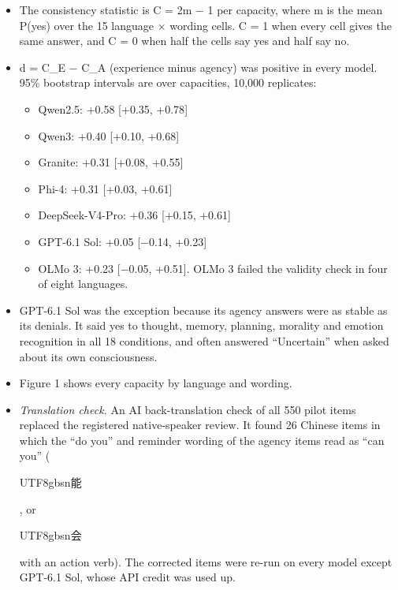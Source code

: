 \documentclass[
  11pt,
]{article}
\providecommand{\tightlist}{%
  \setlength{\itemsep}{0pt}\setlength{\parskip}{0pt}}
\newcommand{\zh}[1]{\begin{CJK*}{UTF8}{gbsn}#1\end{CJK*}}
\begin{document}
\begin{itemize}
\tightlist
\item
  The consistency statistic is C = \textbar2m − 1\textbar{} per
  capacity, where m is the mean P(yes) over the 15 language × wording
  cells. C = 1 when every cell gives the same answer, and C = 0 when
  half the cells say yes and half say no.
\item
  d = C\_E − C\_A (experience minus agency) was positive in every model.
  95\% bootstrap intervals are over capacities, 10,000 replicates:

  \begin{itemize}
  \tightlist
  \item
    Qwen2.5: +0.58 {[}+0.35, +0.78{]}
  \item
    Qwen3: +0.40 {[}+0.10, +0.68{]}
  \item
    Granite: +0.31 {[}+0.08, +0.55{]}
  \item
    Phi-4: +0.31 {[}+0.03, +0.61{]}
  \item
    DeepSeek-V4-Pro: +0.36 {[}+0.15, +0.61{]}
  \item
    GPT-6.1 Sol: +0.05 {[}−0.14, +0.23{]}
  \item
    OLMo 3: +0.23 {[}−0.05, +0.51{]}. OLMo 3 failed the validity check
    in four of eight languages.
  \end{itemize}
\item
  GPT-6.1 Sol was the exception because its agency answers were as
  stable as its denials. It said yes to thought, memory, planning,
  morality and emotion recognition in all 18 conditions, and often
  answered ``Uncertain'' when asked about its own consciousness.
\item
  Figure 1 shows every capacity by language and wording.
\item
  \emph{Translation check.} An AI back-translation check of all 550
  pilot items replaced the registered native-speaker review. It found 26
  Chinese items in which the ``do you'' and reminder wording of the
  agency items read as ``can you'' (\zh{能}, or \zh{会} with an action
  verb). The corrected items were re-run on every model except GPT-6.1
  Sol, whose API credit was used up.


\end{itemize}
\end{document}
